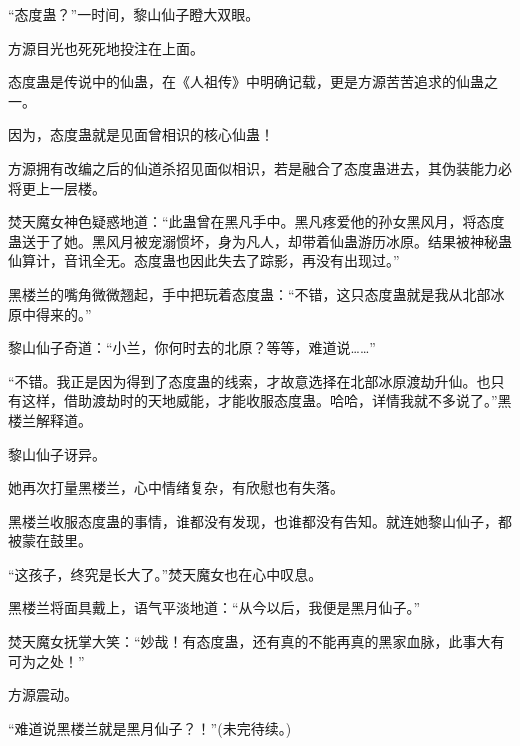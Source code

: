 \begin{this_body}
“态度蛊？”一时间，黎山仙子瞪大双眼。

方源目光也死死地投注在上面。

态度蛊是传说中的仙蛊，在《人祖传》中明确记载，更是方源苦苦追求的仙蛊之一。

因为，态度蛊就是见面曾相识的核心仙蛊！

方源拥有改编之后的仙道杀招见面似相识，若是融合了态度蛊进去，其伪装能力必将更上一层楼。

焚天魔女神色疑惑地道：“此蛊曾在黑凡手中。黑凡疼爱他的孙女黑风月，将态度蛊送于了她。黑风月被宠溺惯坏，身为凡人，却带着仙蛊游历冰原。结果被神秘蛊仙算计，音讯全无。态度蛊也因此失去了踪影，再没有出现过。”

黑楼兰的嘴角微微翘起，手中把玩着态度蛊：“不错，这只态度蛊就是我从北部冰原中得来的。”

黎山仙子奇道：“小兰，你何时去的北原？等等，难道说……”

“不错。我正是因为得到了态度蛊的线索，才故意选择在北部冰原渡劫升仙。也只有这样，借助渡劫时的天地威能，才能收服态度蛊。哈哈，详情我就不多说了。”黑楼兰解释道。

黎山仙子讶异。

她再次打量黑楼兰，心中情绪复杂，有欣慰也有失落。

黑楼兰收服态度蛊的事情，谁都没有发现，也谁都没有告知。就连她黎山仙子，都被蒙在鼓里。

“这孩子，终究是长大了。”焚天魔女也在心中叹息。

黑楼兰将面具戴上，语气平淡地道：“从今以后，我便是黑月仙子。”

焚天魔女抚掌大笑：“妙哉！有态度蛊，还有真的不能再真的黑家血脉，此事大有可为之处！”

方源震动。

“难道说黑楼兰就是黑月仙子？！”(未完待续。)

\end{this_body}

